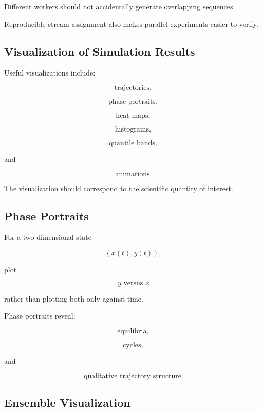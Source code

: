 Different workers should not accidentally generate overlapping sequences.

Reproducible stream assignment also makes parallel experiments easier to
verify.

\subsection{Visualization of Simulation Results}
\label{subsec:simulation-visualization}

Useful visualizations include:

\[
\boxed{
\text{trajectories},
}
\]

\[
\boxed{
\text{phase portraits},
}
\]

\[
\boxed{
\text{heat maps},
}
\]

\[
\boxed{
\text{histograms},
}
\]

\[
\boxed{
\text{quantile bands},
}
\]

and

\[
\boxed{
\text{animations}.
}
\]

The visualization should correspond to the scientific quantity of
interest.

\subsection{Phase Portraits}
\label{subsec:simulation-phase-portraits}

For a two-dimensional state

\[
(x(t),y(t)),
\]

plot

\[
\boxed{
y
\text{ versus }
x
}
\]

rather than plotting both only against time.

Phase portraits reveal:

\[
\boxed{
\text{equilibria},
}
\]

\[
\boxed{
\text{cycles},
}
\]

and

\[
\boxed{
\text{qualitative trajectory structure}.
}
\]

\subsection{Ensemble Visualization}
\label{subsec:ensemble-visualization}

